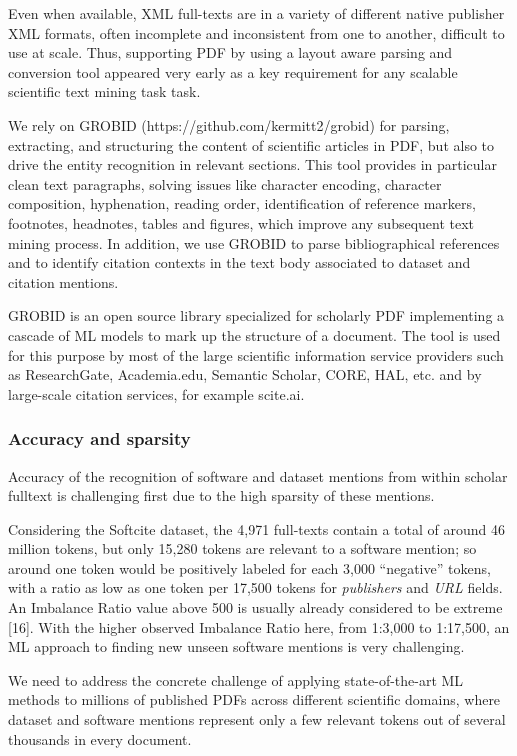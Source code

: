 \documentclass[
]{article}
\begin{document}
Even when available, XML full-texts are in a variety of different native
publisher XML formats, often incomplete and inconsistent from one to
another, difficult to use at scale. Thus, supporting PDF by using a
layout aware parsing and conversion tool appeared very early as a key
requirement for any scalable scientific text mining task task.

We rely on GROBID (https://github.com/kermitt2/grobid) for parsing,
extracting, and structuring the content of scientific articles in PDF,
but also to drive the entity recognition in relevant sections. This tool
provides in particular clean text paragraphs, solving issues like
character encoding, character composition, hyphenation, reading order,
identification of reference markers, footnotes, headnotes, tables and
figures, which improve any subsequent text mining process. In addition,
we use GROBID to parse bibliographical references and to identify
citation contexts in the text body associated to dataset and citation
mentions.

GROBID is an open source library specialized for scholarly PDF
implementing a cascade of ML models to mark up the structure of a
document. The tool is used for this purpose by most of the large
scientific information service providers such as ResearchGate,
Academia.edu, Semantic Scholar, CORE, HAL, etc. and by large-scale
citation services, for example scite.ai.

\hypertarget{accuracy-and-sparsity}{%
\subsubsection{Accuracy and sparsity}\label{accuracy-and-sparsity}}

Accuracy of the recognition of software and dataset mentions from within
scholar fulltext is challenging first due to the high sparsity of these
mentions.

Considering the Softcite dataset, the 4,971 full-texts contain a total
of around 46 million tokens, but only 15,280 tokens are relevant to a
software mention; so around one token would be positively labeled for
each 3,000 ``negative'' tokens, with a ratio as low as one token per
17,500 tokens for \emph{publishers} and \emph{URL} fields. An Imbalance
Ratio value above 500 is usually already considered to be extreme
{[}16{]}. With the higher observed Imbalance Ratio here, from 1:3,000 to
1:17,500, an ML approach to finding new unseen software mentions is very
challenging.

We need to address the concrete challenge of applying state-of-the-art
ML methods to millions of published PDFs across different scientific
domains, where dataset and software mentions represent only a few
relevant tokens out of several thousands in every document.
\end{document}

